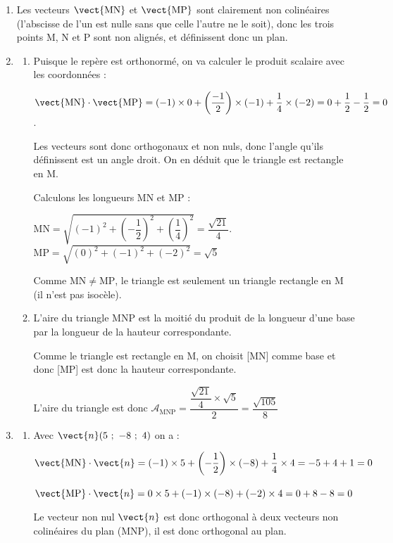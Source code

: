 \begin{enumerate}
\item Les vecteurs $\vect{\mathrm{MN}}$ et $\vect{\mathrm{MP}}$ sont clairement non colinéaires (l'abscisse de l'un est nulle sans que celle l'autre ne le soit), donc les trois points M, N et P sont non alignés, et définissent donc un plan.

\item
	\begin{enumerate}
		\item Puisque le repère est orthonormé, on va calculer le produit scalaire avec les coordonnées :

$\vect{\text{MN}} \cdot \vect{\text{MP}} = (-1)\times 0 + \left(\dfrac{-1}{2}\right) \times (-1) + \dfrac{1}{4}\times (-2) = 0 + \dfrac{1}{2} - \dfrac{1}{2} = 0 $.

Les vecteurs sont donc orthogonaux et non nuls, donc l'angle qu'ils définissent est un angle droit. On en déduit que le triangle est rectangle en M.

Calculons les longueurs MN et MP :

$\mathrm{MN} = \sqrt{\left(-1\right)^2+\left(-\dfrac{1}{2}\right)^2+\left(\dfrac{1}{4}\right)^2 } = \dfrac{\sqrt{21}}{4}$.
\qquad
$\mathrm{MP} = \sqrt{\left(0\right)^2+\left(-1\right)^2+\left(-2\right)^2} = \sqrt{5}$

Comme $\mathrm{MN} \neq \mathrm{MP}$, le triangle est seulement un triangle rectangle en M (il n'est pas isocèle).

	\item L'aire du triangle MNP est la moitié du produit de la longueur d'une base par la longueur de la hauteur correspondante.

Comme le triangle est rectangle en M, on choisit [MN] comme base et donc [MP] est donc la hauteur correspondante.

L'aire du triangle est donc $\mathcal{A}_{\mathrm{MNP}} = \dfrac{\dfrac{\sqrt{21}}{4}\times \sqrt{5}}{2} = \dfrac{\sqrt{105}}{8}$
	\end{enumerate}
\item
	\begin{enumerate}
		\item Avec $\vect{n}(5~;~-8~;~4)$ on a :

$\vect{\mathrm{MN}}\cdot \vect{n} = (-1)\times 5 + \left(-\dfrac{1}{2}\right) \times (-8) + \dfrac{1}{4} \times 4 = -5 + 4 + 1 = 0$

$\vect{\mathrm{MP}}\cdot \vect{n} = 0\times 5 + (-1) \times (-8) + (-2) \times 4 = 0 + 8 -8 = 0$

Le vecteur non nul $\vect{n}$ est donc orthogonal à deux vecteurs non colinéaires du plan (MNP), il est donc orthogonal au plan.


\end{enumerate}
\end{enumerate}
